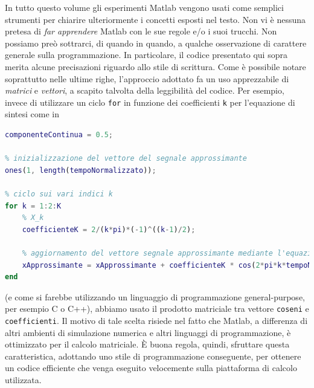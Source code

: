 \documentclass[12pt,oneside,openany]{memoir}
\numberwithin{equation}{subsection}
\begin{document}
In tutto questo volume gli esperimenti Matlab vengono usati come semplici
strumenti per chiarire ulteriormente i concetti esposti nel testo. Non vi
\`e nessuna pretesa di \textit{far apprendere} Matlab con le sue regole e/o i
suoi trucchi. Non possiamo pre\`o sottrarci, di quando in quando, a qualche
osservazione di carattere generale sulla programmazione. In particolare, il
codice presentato qui sopra merita alcune precisazioni riguardo allo stile di
scrittura. Come \`e possibile notare soprattutto nelle ultime righe, l'approccio
adottato fa un uso apprezzabile di \textit{matrici} e \textit{vettori}, a
scapito talvolta della leggibilit\`a del codice. Per esempio, invece di
utilizzare un ciclo \texttt{for} in funzione dei coefficienti \texttt{k} per
l'equazione di sintesi come in
\begin{lstlisting}[frame=single, language=Matlab]
% X_0 = 1/2
componenteContinua = 0.5;

% inizializzazione del vettore del segnale approssimante
ones(1, length(tempoNormalizzato));

% ciclo sui vari indici k
for k = 1:2:K
	% X_k
	coefficienteK = 2/(k*pi)*(-1)^((k-1)/2);
	
	% aggiornamento del vettore segnale approssimante mediante l'equazione di sintesi
	xApprossimante = xApprossimante + coefficienteK * cos(2*pi*k*tempoNormalizzato);
end
\end{lstlisting}
(e come si farebbe utilizzando un linguaggio di programmazione general-purpose,
per esempio C o C++), abbiamo usato il prodotto matriciale tra vettore
\texttt{coseni} e \texttt{coefficienti}. Il motivo di tale scelta risiede nel
fatto che Matlab, a differenza di altri ambienti di simulazione numerica e altri
linguaggi di programmazione, \`e ottimizzato per il calcolo matriciale. \`E
buona regola, quindi, sfruttare questa caratteristica, adottando uno stile di
programmazione conseguente, per ottenere un codice efficiente che venga eseguito
velocemente sulla piattaforma di calcolo utilizzata.


\newpage
\end{document}
